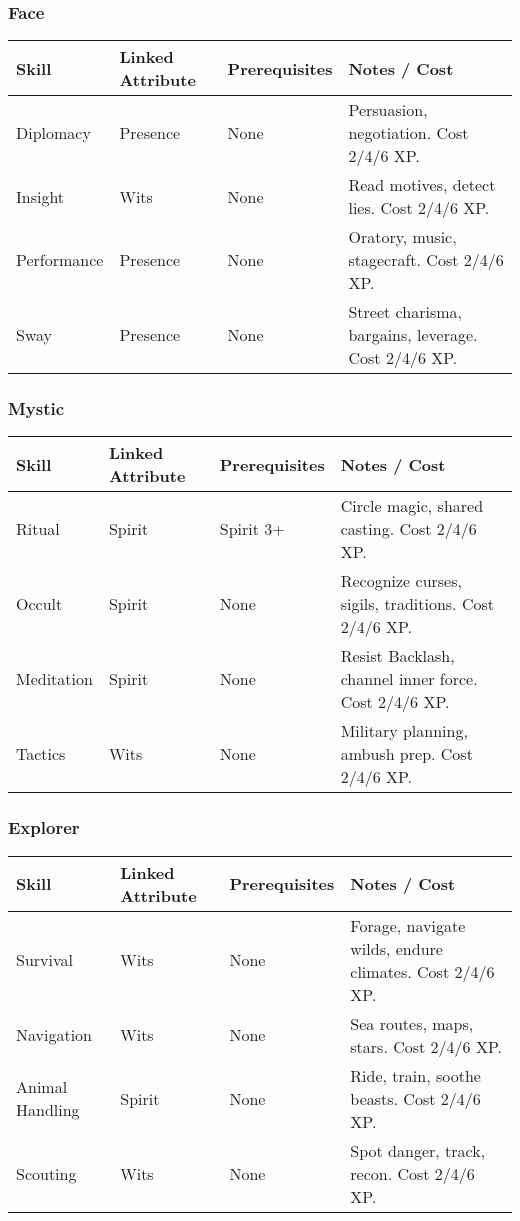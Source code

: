 \documentclass[12pt]{book}
\begin{document}
\subsubsection*{Face}
\begin{tabular}{@{}llll@{}}
\toprule
\textbf{Skill} & \textbf{Linked Attribute} & \textbf{Prerequisites} & \textbf{Notes / Cost} \\
\midrule
Diplomacy & Presence & None & Persuasion, negotiation. Cost 2/4/6 XP. \\
Insight & Wits & None & Read motives, detect lies. Cost 2/4/6 XP. \\
Performance & Presence & None & Oratory, music, stagecraft. Cost 2/4/6 XP. \\
Sway & Presence & None & Street charisma, bargains, leverage. Cost 2/4/6 XP. \\
\bottomrule
\end{tabular}

\subsubsection*{Mystic}
\begin{tabular}{@{}llll@{}}
\toprule
\textbf{Skill} & \textbf{Linked Attribute} & \textbf{Prerequisites} & \textbf{Notes / Cost} \\
\midrule
Ritual & Spirit & Spirit 3+ & Circle magic, shared casting. Cost 2/4/6 XP. \\
Occult & Spirit & None & Recognize curses, sigils, traditions. Cost 2/4/6 XP. \\
Meditation & Spirit & None & Resist Backlash, channel inner force. Cost 2/4/6 XP. \\
Tactics & Wits & None & Military planning, ambush prep. Cost 2/4/6 XP. \\
\bottomrule
\end{tabular}

\subsubsection*{Explorer}
\begin{tabular}{@{}llll@{}}
\toprule
\textbf{Skill} & \textbf{Linked Attribute} & \textbf{Prerequisites} & \textbf{Notes / Cost} \\
\midrule
Survival & Wits & None & Forage, navigate wilds, endure climates. Cost 2/4/6 XP. \\
Navigation & Wits & None & Sea routes, maps, stars. Cost 2/4/6 XP. \\
Animal Handling & Spirit & None & Ride, train, soothe beasts. Cost 2/4/6 XP. \\
Scouting & Wits & None & Spot danger, track, recon. Cost 2/4/6 XP. \\
\bottomrule
\end{tabular}
\end{document}
